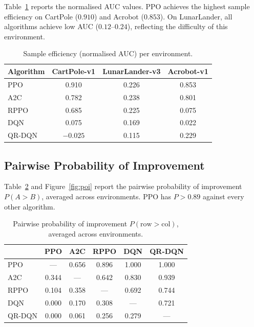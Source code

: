 Table~\ref{tab:sample-eff} reports the normalised AUC values. PPO achieves
the highest sample efficiency on CartPole ($0.910$) and Acrobot ($0.853$).
On LunarLander, all algorithms achieve low AUC ($0.12$--$0.24$),
reflecting the difficulty of this environment.

\begin{table}[htbp!]
\centering
\caption[EXP1: Sample efficiency AUC]{Sample efficiency (normalised AUC) per environment.}
\label{tab:sample-eff}
\begin{tabular}{lccc}
\toprule
\textbf{Algorithm} & \textbf{CartPole-v1} & \textbf{LunarLander-v3}
                   & \textbf{Acrobot-v1} \\
\midrule
PPO    & 0.910 & 0.226 & 0.853 \\
A2C    & 0.782 & 0.238 & 0.801 \\
RPPO   & 0.685 & 0.225 & 0.075 \\
DQN    & 0.075 & 0.169 & 0.022 \\
QR-DQN & $-0.025$ & 0.115 & 0.229 \\
\bottomrule
\end{tabular}
\end{table}

\subsection{Pairwise Probability of Improvement}
\label{sec:poi}

Table~\ref{tab:poi} and Figure~\ref{fig:poi} report the pairwise probability of improvement $P(A > B)$, averaged across environments. PPO has $P > 0.89$ against every other algorithm.


\begin{table}[htbp!]
\centering
\caption[EXP1: Pairwise probability of improvement]{Pairwise probability of improvement $P(\text{row} > \text{col})$,
         averaged across environments.}
\label{tab:poi}
\begin{tabular}{lccccc}
\toprule
         & \textbf{PPO} & \textbf{A2C} & \textbf{RPPO}
         & \textbf{DQN} & \textbf{QR-DQN} \\
\midrule
PPO    & ---   & 0.656 & 0.896 & 1.000 & 1.000 \\
A2C    & 0.344 & ---   & 0.642 & 0.830 & 0.939 \\
RPPO   & 0.104 & 0.358 & ---   & 0.692 & 0.744 \\
DQN    & 0.000 & 0.170 & 0.308 & ---   & 0.721 \\
QR-DQN & 0.000 & 0.061 & 0.256 & 0.279 & ---   \\
\bottomrule
\end{tabular}
\end{table}

